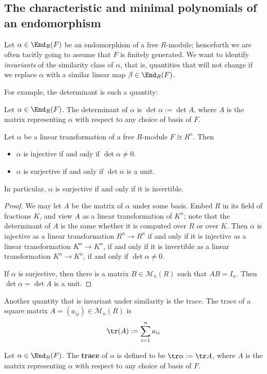 \subsection{The characteristic and minimal polynomials of an endomorphism}
Let $\alpha\in\End_R(F)$ be an endomorphism of a free $R$-module; henceforth we are often tacitly going to assume that $F$ is finitely generated. We want to identify \textit{invariants} of the similarity class of $\alpha$, that is, quantities that will not change if we replace $\alpha$ with a similar linear map $\beta\in\End_R(F)$.\par
For example, the determinant is such a quantity:
\begin{definition}
Let $\alpha\in\End_R(F)$. The determinant of $\alpha$ is $\det\alpha:=\det A$, where $A$ is the matrix representing $\alpha$ with respect to any choice of basis of $F$.
\end{definition}
\begin{proposition}
Let $\alpha$ be a linear transformation of a free $R$-module $F\cong R^n$. Then 
\begin{itemize}
\item $\alpha$ is injective if and only if $\det\alpha\neq 0$.
\item $\alpha$ is surjective if and only if $\det\alpha$ is a unit.
\end{itemize}
In particular, $\alpha$ is surjective if and only if it is invertible.
\end{proposition}
\begin{proof}
We may let $A$ be the matrix of $\alpha$ under some basis. Embed $R$ in its field of fractions $K$, and view $A$ as a linear transformation of $K^n$; note that the determinant of $A$ is the same whether it is computed over $R$ or over $K$. Then $\alpha$ is injective as a linear transformation $R^n\to R^n$ if and only if it is injective as a linear transformation $K^n\to K^n$, if and only if it is invertible as a linear transformation $K^n\to K^n$, if and only if $\det\alpha\neq 0$.\par
If $\alpha$ is surjective, then there is a matrix $B\in\mathcal{M}_n(R)$ such that $AB=I_n$. Then $\det\alpha=\det A$ is a unit.
\end{proof}
Another quantity that is invariant under similarity is the trace. The trace of a square matrix $A=(a_{ij})\in\mathcal{M}_n(R)$ is
\[\tr(A):=\sum_{i=1}^{n}a_{ii}\]
\begin{definition}
Let $\alpha\in\End_R(F)$. The \textbf{trace} of $\alpha$ is defined to be $\tr\alpha:=\tr A$, where $A$ is the matrix representing $\alpha$ with respect to any choice of basis of $F$.
\end{definition}

